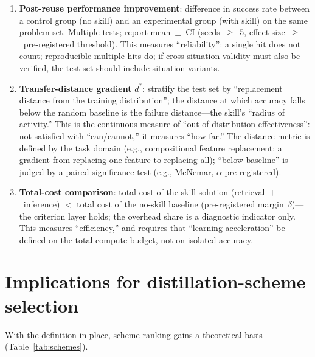 \documentclass[11pt]{article}
\begin{document}
\begin{enumerate}
\item \textbf{Post-reuse performance improvement}: difference in success rate between a control group (no skill) and an experimental group (with skill) on the same problem set. Multiple tests; report mean~$\pm$~CI (seeds~$\geq$~5, effect size~$\geq$~pre-registered threshold). This measures ``reliability'': a single hit does not count; reproducible multiple hits do; if cross-situation validity must also be verified, the test set should include situation variants.
\item \textbf{Transfer-distance gradient} $d^{*}$: stratify the test set by ``replacement distance from the training distribution''; the distance at which accuracy falls below the random baseline is the failure distance---the skill's ``radius of activity.'' This is the continuous measure of ``out-of-distribution effectiveness'': not satisfied with ``can/cannot,'' it measures ``how far.'' The distance metric is defined by the task domain (e.g., compositional feature replacement: a gradient from replacing one feature to replacing all); ``below baseline'' is judged by a paired significance test (e.g., McNemar, $\alpha$ pre-registered).
\item \textbf{Total-cost comparison}: total cost of the skill solution (retrieval~$+$~inference) $<$ total cost of the no-skill baseline (pre-registered margin~$\delta$)---the criterion layer holds; the overhead share is a diagnostic indicator only. This measures ``efficiency,'' and requires that ``learning acceleration'' be defined on the total compute budget, not on isolated accuracy.
\end{enumerate}

\section{Implications for distillation-scheme selection}
\label{sec:implications}

With the definition in place, scheme ranking gains a theoretical basis (Table~\ref{tab:schemes}).
\end{document}

